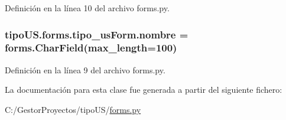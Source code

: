 Definición en la línea 10 del archivo forms.\+py.

\subsubsection[{\texorpdfstring{nombre}{nombre}}]{\setlength{\rightskip}{0pt plus 5cm}tipo\+U\+S.\+forms.\+tipo\+\_\+us\+Form.\+nombre = forms.\+Char\+Field(max\+\_\+length=100)\hspace{0.3cm}{\ttfamily [static]}}\hypertarget{classtipo_u_s_1_1forms_1_1tipo__us_form_ab850f5bbdd80b05c50481c75d21d361f}{}\label{classtipo_u_s_1_1forms_1_1tipo__us_form_ab850f5bbdd80b05c50481c75d21d361f}


Definición en la línea 9 del archivo forms.\+py.



La documentación para esta clase fue generada a partir del siguiente fichero\+:\begin{DoxyCompactItemize}
\item 
C\+:/\+Gestor\+Proyectos/tipo\+U\+S/\hyperlink{tipo_u_s_2forms_8py}{forms.\+py}\end{DoxyCompactItemize}
